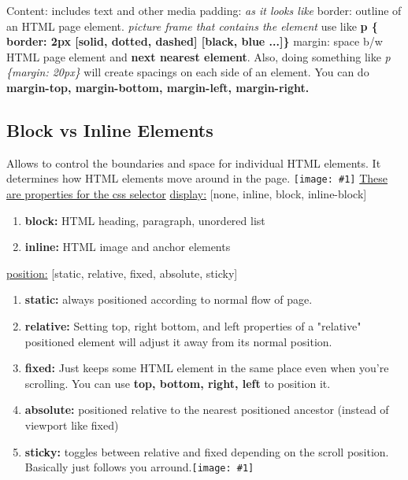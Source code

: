 \documentclass{article}
\def\image#1#2{{\texttt{[image: \#1]}}}
\def\enum#1{\begin{enumerate}#1\end{enumerate}}
\begin{document}
Content: includes text and other media \newline \newline
padding: \textit{as it looks like} \newline \newline
border: outline of an HTML page element. \textit{picture frame that contains the element}
use like \newline
\textbf{p \{ border: 2px [solid, dotted, dashed] [black, blue ...]\}} \newline \newline
margin: space b/w HTML page element and \textbf{next nearest element}. \newline
Also, doing something like \textit{p \{margin: 20px\}} will create spacings on each side of an element.\newline
You can do \textbf{margin-top, margin-bottom, margin-left, margin-right.}\newline \newline



\subsection{Block vs Inline Elements}
Allows to control the boundaries and space for individual HTML elements. It determines how HTML elements move around in the page.
\newline
\image{block-inline.png}{0.4}
\newline
\underline{These are properties for the css selector}\newline \newline
\ul{display:} [none, inline, block, inline-block]
\enum{
\item{\textbf{block:} HTML heading, paragraph, unordered list}
\item{\textbf{inline:} HTML image and anchor elements}
}
\ul{position:} [static, relative, fixed, absolute, sticky]
\enum{
\item{\textbf{static:} always positioned according to normal flow of page.}
\item{\textbf{relative:} Setting top, right bottom, and left properties of a "relative" positioned element will adjust it away from its normal position.\newline \image{relative.png}{0.3}}
\item{\textbf{fixed:} Just keeps some HTML element in the same place even when you're scrolling. You can use \textbf{top, bottom, right, left} to position it.\newline \image{fixed.png}{0.3}}
\item{\textbf{absolute:} positioned relative to the nearest positioned ancestor (instead of viewport like fixed)\newline \image{absolute.png}{0.3}}
\item{\textbf{sticky:} toggles between relative and fixed depending on the scroll position. Basically just follows you arround.\image{sticky.png}{0.3}}
}
\end{document}

